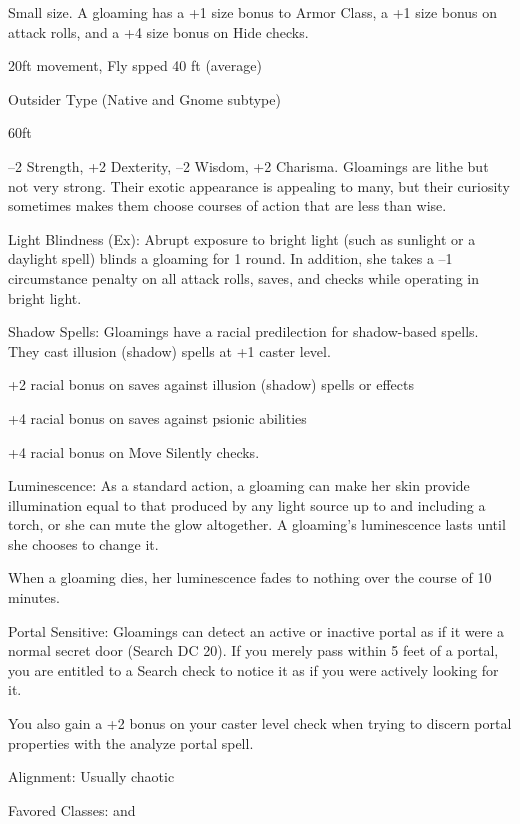 \begin{multicols}{2}

\begin{itemize*}
\item Small size. A gloaming has a +1 size bonus to Armor Class, a +1 size bonus on attack rolls, and a +4 size bonus on Hide checks.
\item 20ft movement, Fly spped 40 ft (average)
\item Outsider Type (Native and Gnome subtype)
\item {} 60ft
\item –2 Strength, +2 Dexterity, –2 Wisdom, +2 Charisma. Gloamings are lithe but not very strong. Their exotic appearance is appealing to many, but their curiosity sometimes makes them choose courses of action that are less than wise.
\item Light Blindness (Ex): Abrupt exposure to bright light (such as sunlight or a daylight spell) blinds a gloaming for 1 round. In addition, she takes a –1 circumstance penalty on all attack rolls, saves, and checks while operating in bright light.
\item Shadow Spells: Gloamings have a racial predilection for shadow-based spells. They cast illusion (shadow) spells at +1 caster level.
\item +2 racial bonus on saves against illusion (shadow) spells or effects
\item +4 racial bonus on saves against psionic abilities
\item +4 racial bonus on Move Silently checks.
\item Luminescence: As a standard action, a gloaming can make her skin provide illumination equal to that produced by any light source up to and including a torch, or she can mute the glow altogether. A gloaming’s luminescence lasts until she chooses to change it.

When a gloaming dies, her luminescence fades to nothing over the course of 10 minutes.
\item Portal Sensitive: Gloamings can detect an active or inactive portal as if it were a normal secret door (Search DC 20). If you merely pass within 5 feet of a portal, you are entitled to a Search check to notice it as if you were actively looking for it.

You also gain a +2 bonus on your caster level check when trying to discern portal properties with the analyze portal spell.
\item Alignment: Usually chaotic
\item Favored Classes:  and 
\end{itemize*}


\end{multicols}

